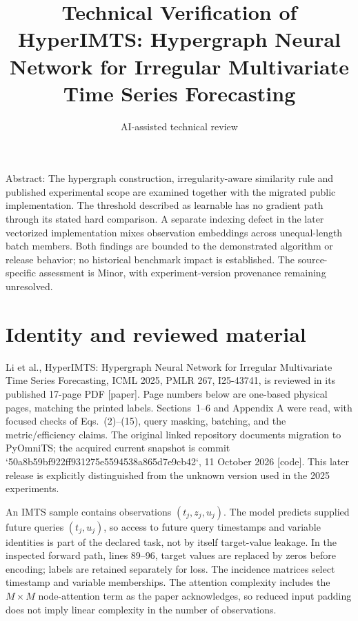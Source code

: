 \documentclass[10pt]{article}
\title{Technical Verification of
HyperIMTS: Hypergraph Neural Network for Irregular Multivariate Time Series Forecasting}
\author{AI-assisted technical review}
\date{}
\begin{document}
\maketitle
Abstract: The hypergraph construction, irregularity-aware similarity rule and published experimental scope are examined together with the migrated public implementation. The threshold described as learnable has no gradient path through its stated hard comparison. A separate indexing defect in the later vectorized implementation mixes observation embeddings across unequal-length batch members. Both findings are bounded to the demonstrated algorithm or release behavior; no historical benchmark impact is established. The source-specific assessment is Minor, with experiment-version provenance remaining unresolved.\par
\section*{Identity and reviewed material}
Li et al., HyperIMTS: Hypergraph Neural Network for Irregular Multivariate Time Series Forecasting, ICML 2025, PMLR 267, I25-43741, is reviewed in its published 17-page PDF [paper]. Page numbers below are one-based physical pages, matching the printed labels. Sections 1–6 and Appendix A were read, with focused checks of Eqs. (2)–(15), query masking, batching, and the metric/efficiency claims. The original linked repository documents migration to PyOmniTS; the acquired current snapshot is commit `50a8b59bf922ff931275e5594538a865d7e9cb42`, 11 October 2026 [code]. This later release is explicitly distinguished from the unknown version used in the 2025 experiments.\par
An IMTS sample contains observations \((t_j,z_j,u_j)\). The model predicts supplied future queries \((t_j,u_j)\), so access to future query timestamps and variable identities is part of the declared task, not by itself target-value leakage. In the inspected forward path, lines 89–96, target values are replaced by zeros before encoding; labels are retained separately for loss. The incidence matrices select timestamp and variable memberships. The attention complexity includes the \(M\times M\) node-attention term as the paper acknowledges, so reduced input padding does not imply linear complexity in the number of observations.\par
\end{document}
